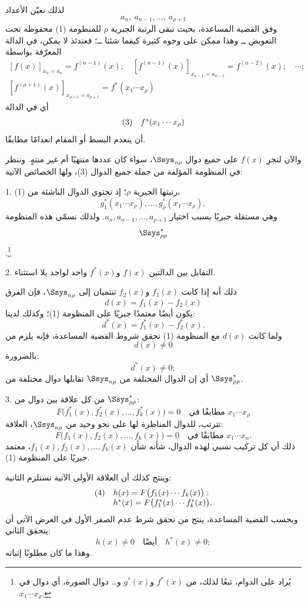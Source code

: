 \documentclass[11pt]{article}
\newcommand{\srcLTR}[1]{\relax\ifmmode\text{\mbox{\babelsublr{\foreignlanguage{english}{#1}}}}\else\babelsublr{\foreignlanguage{english}{#1}}\fi}
\newcommand{\srcfn}[2]{\begingroup\renewcommand{\thefootnote}{\srcLTR{#1}}\footnote{#2}\addtocounter{footnote}{-1}\endgroup}
\begin{document}
لذلك نعيّن الأعداد
\[
 a_n,\ a_{n-1},\ldots,\ a_{\rho+1}
\]
وفق القضية المساعدة، بحيث تبقى الرتبة الجبرية $\rho$ للمنظومة (1) محفوظة تحت التعويض ــ وهذا ممكن على وجوه كثيرة كيفما شئنا ــ؛ فعندئذ لا يمكن، في الدالة المعرّفة بواسطة
\[
\begin{array}{c}
[f(x)]_{x_n=a_n}=f^{(n-1)}(x);\quad
[f^{(n-1)}(x)]_{x_{n-1}=a_{n-1}}=f^{(n-2)}(x);\quad\cdots;\\[0.25em]
[f^{(\rho+1)}(x)]_{x_{\rho+1}=a_{\rho+1}}=f^*(x_1\cdots x_\rho)
\end{array}
\]
أي في الدالة
\[
\begin{array}{@{}l@{\quad}c@{}}
(3)& f^*(x_1\cdots x_\rho)
\end{array}
\]
أن ينعدم البسط أو المقام انعدامًا مطابقًا.

والآن لتجرِ $f(x)$ على جميع دوال $\Ssys_{n\rho}$، سواء كان عددها منتهيًا أم غير منتهٍ. وننظر في المنظومة المؤلفة من جملة جميع الدوال (3)، ولها الخصائص الآتية:

1. رتبتها الجبرية $\rho$؛ إذ تحتوي الدوال الناشئة من (1)،
\[
g_1^*(x_1\cdots x_\rho),\ldots,g_\rho^*(x_1\cdots x_\rho),
\]
وهي مستقلة جبريًا بسبب اختيار $a_n,a_{n-1},\ldots,a_{\rho+1}$. ولذلك نسمّي هذه المنظومة
\[
\Ssys^*_{\rho\rho}
\]
.\srcfn{**)}{يُراد على الدوام، تبعًا لذلك، من $f^*(x)$ و$g^*(x)$ و\ldots{} دوال الصورة، أي دوال في $x_1\cdots x_\rho$.}

2. التقابل بين الدالتين $f(x)$ و$f^*(x)$ واحد لواحد بلا استثناء.

ذلك أنه إذا كانت $f_1(x)$ و$f_2(x)$ تنتميان إلى $\Ssys_{n\rho}$، فإن الفرق
\[
d(x)=f_1(x)-f_2(x)
\]
يكون أيضًا معتمدًا جبريًا على المنظومة (1)؛ وكذلك لدينا:
\[
d^*(x)=f_1^*(x)-f_2^*(x).
\]
ولما كانت $d(x)$ مع المنظومة (1) تحقق شروط القضية المساعدة، فإنه يلزم من
\[
d(x)\ne0
\]
بالضرورة:
\[
d^*(x)\ne0;
\]
أي إن الدوال المختلفة من $\Ssys_{n\rho}$ تقابلها دوال مختلفة من $\Ssys^*_{\rho\rho}$.

3. من كل علاقة بين دوال من $\Ssys^*_{\rho\rho}$:
\[
F\bigl(f_1^*(x),f_2^*(x),\ldots,f_k^*(x)\bigr)=0
\quad\text{مطابقًا في }x_1\cdots x_\rho
\]
تترتب، للدوال المناظرة لها على نحو وحيد من $\Ssys_{n\rho}$، العلاقة:
\[
F\bigl(f_1(x),f_2(x),\ldots,f_k(x)\bigr)=0
\quad\text{مطابقًا في }x_1\cdots x_n.
\]
ذلك أن كل تركيب نسبي لهذه الدوال، شأنه شأن $f_1(x),f_2(x),\ldots,f_k(x)$، معتمد جبريًا على المنظومة (1).

وينتج كذلك أن العلاقة الأولى الآتية تستلزم الثانية:
\[
\begin{array}{@{}l@{\quad}l@{}}
(4)& h(x)=F\bigl(f_1(x)\cdots f_k(x)\bigr):\\
& h^*(x)=F\bigl(f_1^*(x)\cdots f_k^*(x)\bigr).
\end{array}
\]
وبحسب القضية المساعدة، ينتج من تحقق شرط عدم الصفر الأول في العرض الآتي أن يتحقق الثاني:
\[
h(x)\ne0\quad\text{أيضًا}\quad h^*(x)\ne0;
\]
وهذا ما كان مطلوبًا إثباته.
\end{document}
